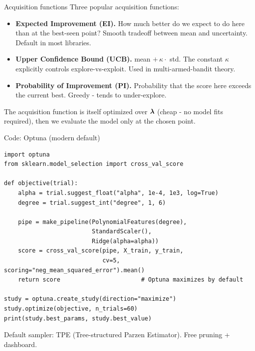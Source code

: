 \documentclass[aspectratio=169]{beamer}
\begin{document}
\begin{frame}{Acquisition functions}
  Three popular acquisition functions:
  \vfill
  \begin{itemize}
    \item \textbf{Expected Improvement (EI).} How much better do we expect to do here than at the best-seen point? Smooth tradeoff between mean and uncertainty. Default in most libraries.
    \item \textbf{Upper Confidence Bound (UCB).} mean $+\, \kappa \cdot$ std. The constant $\kappa$ explicitly controls explore-vs-exploit. Used in multi-armed-bandit theory.
    \item \textbf{Probability of Improvement (PI).} Probability that the score here exceeds the current best. Greedy - tends to under-explore.
  \end{itemize}
  \vfill
  The acquisition function is itself optimized over $\bm{\lambda}$ (cheap - no model fits required), then we evaluate the model only at the chosen point.
\end{frame}

\begin{frame}[fragile]{Code: Optuna (modern default)}
\begin{lstlisting}
import optuna
from sklearn.model_selection import cross_val_score

def objective(trial):
    alpha = trial.suggest_float("alpha", 1e-4, 1e3, log=True)
    degree = trial.suggest_int("degree", 1, 6)

    pipe = make_pipeline(PolynomialFeatures(degree),
                         StandardScaler(),
                         Ridge(alpha=alpha))
    score = cross_val_score(pipe, X_train, y_train,
                            cv=5, scoring="neg_mean_squared_error").mean()
    return score                       # Optuna maximizes by default

study = optuna.create_study(direction="maximize")
study.optimize(objective, n_trials=60)
print(study.best_params, study.best_value)
\end{lstlisting}
  \vfill
  \footnotesize Default sampler: TPE (Tree-structured Parzen Estimator). Free pruning + dashboard.
\end{frame}
\end{document}
